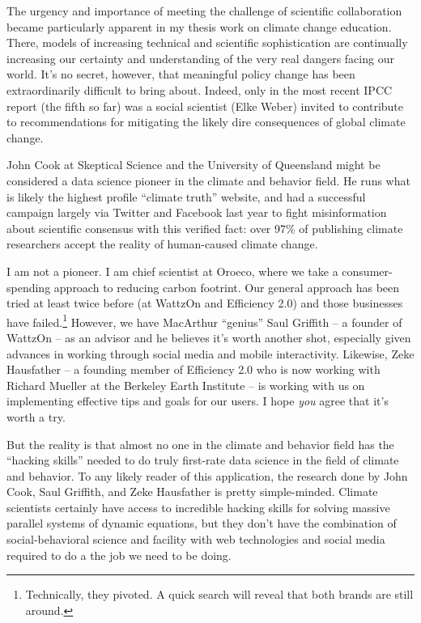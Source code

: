 The urgency and importance of meeting the challenge of scientific collaboration
became particularly apparent in my thesis work on climate change education.
There, models of increasing technical and scientific sophistication are
continually increasing our certainty and understanding of the very real dangers
facing our world. It's no secret, however, that meaningful policy change has
been extraordinarily difficult to bring about. Indeed, only in the most recent
IPCC report (the fifth so far) was a social scientist (Elke Weber) invited to
contribute to recommendations for mitigating the likely dire consequences of
global climate change.

John Cook at Skeptical Science and the University of Queensland might be
considered a data science pioneer in the climate and behavior field. He runs
what is likely the highest profile “climate truth” website, and had a successful
campaign largely via Twitter and Facebook last year to fight misinformation
about scientific consensus with this verified fact: over 97\% of publishing
climate researchers accept the reality of human-caused climate change.

I am not a pioneer. I am chief scientist at Oroeco, where we take a
consumer-spending approach to reducing carbon footrint.  Our general approach
has been tried at least twice before (at WattzOn and Efficiency 2.0) and those
businesses have failed.\footnote{Technically, they pivoted. A quick search will
    reveal that both brands are still around.} However, we have MacArthur
“genius” Saul Griffith -- a founder of WattzOn -- as an advisor and he believes
it's worth another shot, especially given advances in working through social
media and mobile interactivity. Likewise, Zeke Hausfather -- a founding member
of Efficiency 2.0 who is now working with Richard Mueller at the Berkeley Earth
Institute -- is working with us on implementing effective tips and goals for our
users. I hope \emph{you} agree that it's worth a try.

But the reality is that almost no one in the climate and behavior field has the
“hacking skills” needed to do truly first-rate data science in the field of
climate and behavior. To any likely reader of this application, the research
done by John Cook, Saul Griffith, and Zeke Hausfather is pretty simple-minded.
Climate scientists certainly have access to incredible hacking skills for
solving massive parallel systems of dynamic equations, but they don't
have the combination of social-behavioral science and facility with
web technologies and social media required to do a the job we need to be doing.

